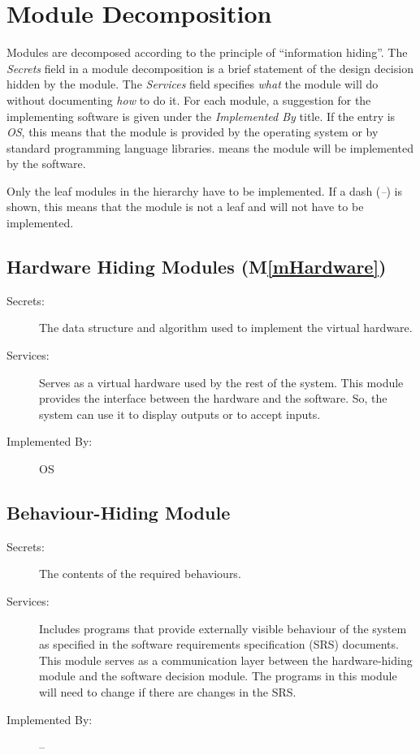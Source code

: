 \documentclass[12pt, titlepage]{article}
\newcommand{\mref}[1]{M\ref{#1}}
\begin{document}
\section{Module Decomposition} \label{SecMD}

Modules are decomposed according to the principle of ``information hiding''. The \emph{Secrets} field in a module
decomposition is a brief statement of the design decision hidden by the
module. The \emph{Services} field specifies \emph{what} the module will do
without documenting \emph{how} to do it. For each module, a suggestion for the
implementing software is given under the \emph{Implemented By} title. If the
entry is \emph{OS}, this means that the module is provided by the operating
system or by standard programming language libraries.  \emph{\progname{}} means the
module will be implemented by the \progname{} software.

Only the leaf modules in the hierarchy have to be implemented. If a dash
(\emph{--}) is shown, this means that the module is not a leaf and will not have
to be implemented.

\subsection{Hardware Hiding Modules (\mref{mHardware})}

\begin{description}
\item[Secrets:]The data structure and algorithm used to implement the virtual
  hardware.
\item[Services:]Serves as a virtual hardware used by the rest of the
  system. This module provides the interface between the hardware and the
  software. So, the system can use it to display outputs or to accept inputs.
\item[Implemented By:] OS
\end{description}

\subsection{Behaviour-Hiding Module}

\begin{description}
\item[Secrets:]The contents of the required behaviours.
\item[Services:]Includes programs that provide externally visible behaviour of
  the system as specified in the software requirements specification (SRS)
  documents. This module serves as a communication layer between the
  hardware-hiding module and the software decision module. The programs in this
  module will need to change if there are changes in the SRS.
\item[Implemented By:] --
\end{description}
\end{document}
